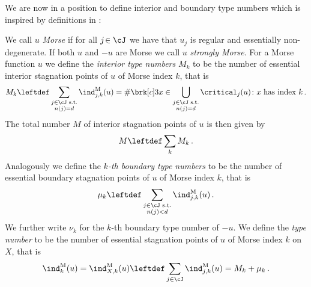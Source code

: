 We are now in a position to define interior and boundary type numbers which is inspired by
definitions in \cite[Definition 10.3]{Morse1969}:
\begin{definition}
  We call $u$ \emph{Morse} if for all $j\!\in\cJ$ we have that $u_j$ is regular and essentially non-degenerate.
  If both $u$ and $-u$ are Morse we call $u$ \emph{strongly Morse}.
  For a Morse function $u$ we define 
  the \emph{interior type numbers} $M_k$ to be the number of essential interior stagnation points of $u$ of Morse index $k$, that is
  \begin{align}
    M_k\leftdef\sum_{\substack{j\in\cJ\text{ s.t.} \\ n(j)=d}}\ind^\text{M}_{j,k}(u)
    =\#\brk[c]3{x\in\bigcup_{\substack{j\in\cJ\text{ s.t.} \\ n(j)=d}}\critical_j(u)\colon x\text{ has index }k}\,.
    \label{eq:def_typenbr_interior}
  \end{align}
  The total number $M$ of interior
  stagnation points of $u$ is then given by
  \begin{align}
    M\leftdef\sum_kM_k\,.\label{eq:def_stagnationPtNbr}
  \end{align}
  Analogously we define the \emph{$k$-th boundary type numbers} to be the number of essential boundary 
  stagnation points of $u$ of Morse index $k$, that is
  \begin{align}
    \mu_k\leftdef\sum_{\substack{j\in\cJ\text{ s.t.}\\ n(j)<d}}\ind^\text{M}_{j,k}(u)\,.\label{eq:bdTypeNbrs}
  \end{align}
  We further write $\nu_k$ for the $k$-th boundary type number of $-u$.
  We define the \emph{type number} to be the number of
  essential stagnation points of $u$ of Morse index $k$ on $X$, that is
  \begin{align}
    \ind^\text{M}_k(u)=\ind^\text{M}_{X,k}(u)\leftdef\sum_{j\in\cJ}\ind^\text{M}_{j,k}(u)=M_k+\mu_k\,.\label{eq:def_typenbr_total}
  \end{align}
\end{definition}

